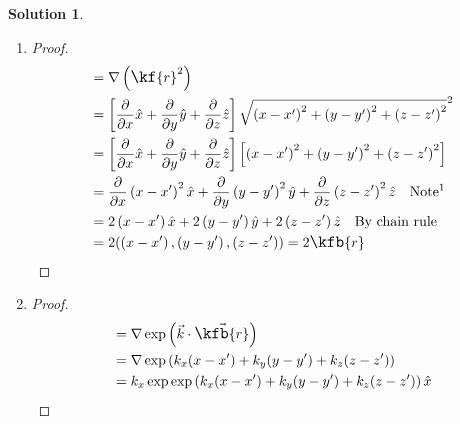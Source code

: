\documentclass[10pt]{article}
\theoremstyle{definition}
\newtheorem{soln}{Solution}
\newcommand{\ux}{\hat{x}}
\newcommand{\uy}{\hat{y}}
\newcommand{\uz}{\hat{z}}
\newcommand{\primed}[1]{#1^\prime}
\newcommand{\scriptr}{\fontsize{12pt}{12pt}\kf{r}}
\newcommand{\bscriptr}{\fontsize{12pt}{12pt}\kfb{r}}
\begin{document}
\begin{soln} ~
  \begin{enumerate}[label=(\alph*)]
    \item \begin{proof}
            \begin{align*}
               & =\nabla\left(\scriptr^2\right)                                                                                                                                                                                     \\
               & =\left[\frac{\partial}{\partial x}\ux + \frac{\partial}{\partial y}\uy + \frac{\partial}{\partial z}\uz \right]\sqrt{\left(x-\primed{x}\right)^2 + \left(y-\primed{y}\right)^2+ \left(z-\primed{z}\right)^2}^2     \\
               & =\left[\frac{\partial}{\partial x}\ux + \frac{\partial}{\partial y}\uy + \frac{\partial}{\partial z}\uz \right]\left[\left(x-\primed{x}\right)^2 + \left(y-\primed{y}\right)^2+ \left(z-\primed{z}\right)^2\right] \\
               & =\frac{\partial}{\partial x}\left(x-\primed{x}\right)^2\ux + \frac{\partial}{\partial y} \left(y-\primed{y}\right)^2\uy + \frac{\partial}{\partial z}\left(z-\primed{z}\right)^2\uz \quad \text{Note\footnotemark} \\
               & =2\left(x-\primed{x}\right)\ux + 2\left(y-\primed{y}\right)\uy+2\left(z-\primed{z}\right)\uz \quad \text{By chain rule}                                                                                            \\
               & =2(\left(x-\primed{x}\right),\left(y-\primed{y}\right),\left(z-\primed{z}\right)) = 2\bscriptr\qedhere
            \end{align*}
          \end{proof}
    \item \begin{proof}
            \begin{align*}
               & =  \nabla\exp\left(\vec{k}\cdot\vec{\bscriptr}\right)                                   \\
               & =  \nabla\exp\left(k_x(x-\primed{x})+k_y(y-\primed{y})+k_z(z-\primed{z})\right)         \\
               & = k_x\exp\exp\left(k_x(x-\primed{x})+k_y(y-\primed{y})+k_z(z-\primed{z})\right)\ux      \\

\end{align*}
\end{proof}
\end{enumerate}
\end{soln}
\end{document}
